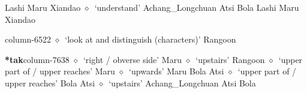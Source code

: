          Lashi 
\hspace{1ex}
         Maru 
\hspace{1ex}
         Xiandao 
\hspace{1ex}
         $\diamond$~`understand'
         Achang\_Longchuan 
\hspace{1ex}
         Atsi 
\hspace{1ex}
         Bola 
\hspace{1ex}
         Lashi 
\hspace{1ex}
         Maru 
\hspace{1ex}
         Xiandao 
  \item {\footnotesize \textbf{}}{\tiny column-6522}
         $\diamond$~`look at and distinguish (characters)'
         Rangoon 
  \item {\footnotesize \textbf{*tak}}{\tiny column-7638}
         $\diamond$~`right / obverse side'
         Maru 
\hspace{1ex}
         $\diamond$~`upstairs'
         Rangoon 
\hspace{1ex}
         $\diamond$~`upper part of / upper reaches'
         Maru 
\hspace{1ex}
         $\diamond$~`upwards'
         Maru 
\hspace{1ex}
         Bola 
\hspace{1ex}
         Atsi 
\hspace{1ex}
         $\diamond$~`upper part of / upper reaches'
         Bola 
\hspace{1ex}
         Atsi 
\hspace{1ex}
         $\diamond$~`upstairs'
         Achang\_Longchuan 
\hspace{1ex}
         Atsi 
\hspace{1ex}
         Bola 
